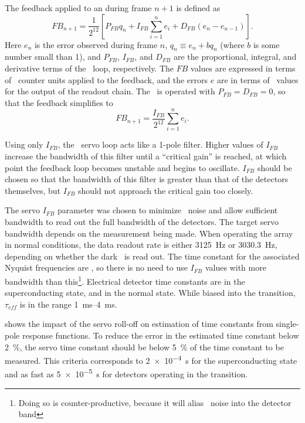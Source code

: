 The feedback applied to an  during frame $n+1$ is defined as \cite{mce_team_data_2013}
\begin{equation}
  FB_{n+1} = \frac{1}{2^{12}} \left[P_{FB} q_n + I_{FB} \sum_{i=1}^n e_i + D_{FB} (e_n - e_{n-1}) \right].
\end{equation}
Here $e_n$ is the error observed during frame $n$, $q_n \equiv e_n + b q_n$ (where $b$ is some number small than 1), and $P_{FB}$, $I_{FB}$, and $D_{FB}$ are the proportional, integral, and derivative terms of the \PID\ loop, respectively.
The $FB$ values are expressed in terms of \DAC\ counter units applied to the  feedback, and the errors $e$ are in terms of \ADC\ values for the output of the readout chain.
The \Imager\ is operated with $P_{FB} = D_{FB} = 0$, so that the feedback simplifies to
\begin{equation} \label{eqn:mce-pid-i-only}
  FB_{n+1} = \frac{I_{FB}}{2^{12}} \sum_{i=1}^n e_i.
\end{equation}

Using only $I_{FB}$, the \MCE\ servo loop acts like a 1-pole filter.
Higher values of $I_{FB}$ increase the bandwidth of this filter until a ``critical gain'' is reached, at which point the feedback loop becomes unstable and begins to oscillate.
$I_{FB}$ should be chosen so that the bandwidth of this filter is greater than that of the detectors themselves, but $I_{FB}$ should not approach the critical gain too closely.

The servo $I_{FB}$ parameter was chosen to minimize \SQUID\ noise and allow sufficient bandwidth to read out the full bandwidth of the detectors.
The target servo bandwidth depends on the measurement being made.
When operating the array in normal conditions, the data readout rate is either \SI{3125}{Hz} or \SI{3030.3}{Hz}, depending on whether the dark \SQUID\ is read out.
The time constant for the associated Nyquist frequencies are , so there is no need to use $I_{FB}$ values with more bandwidth than this\footnote{Doing so is counter-productive, because it will alias \SQUID\ noise into the detector band}.
Electrical detector time constants are  in the superconducting state, and  in the normal state.
While biased into the transition, $\tau_{eff}$ is in the range \SIrange{1}{4}{ms}.

 shows the impact of the servo roll-off on estimation of time constants from single-pole response functions.
To reduce the error in the estimated time constant below \SI{2}{\percent}, the servo time constant should be below \SI{5}{\percent} of the time constant to be measured.
This criteria corresponds to \SI{2e-4}{s} for the superconducting state and as fast as \SI{5e-5}{s} for detectors operating in the transition.

